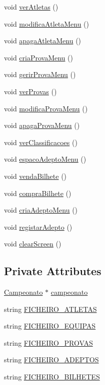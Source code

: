 \begin{DoxyCompactItemize}
void \hyperlink{class_menu_a10eed8f175ddff4a3f6b01010e7b462b}{ver\+Atletas} ()
\item 
void \hyperlink{class_menu_a1803b57b4861a1a9c512a15657eba2f2}{modifica\+Atleta\+Menu} ()
\item 
void \hyperlink{class_menu_a1297455c0dcde9efe57a977620a95091}{apaga\+Atleta\+Menu} ()
\item 
void \hyperlink{class_menu_a22f88ce6c2e5c2e99e3b5bb510f75725}{cria\+Prova\+Menu} ()
\item 
void \hyperlink{class_menu_ad27d59e38495e239dcad48d5bfba7aa5}{gerir\+Prova\+Menu} ()
\item 
void \hyperlink{class_menu_a8b215f578a6ec8be58b2d8cbe464dfcf}{ver\+Provas} ()
\item 
void \hyperlink{class_menu_a58d5cd0655078b665745f75af8bb43c4}{modifica\+Prova\+Menu} ()
\item 
void \hyperlink{class_menu_a4148128d956d192efbd3eb489ac170bb}{apaga\+Prova\+Menu} ()
\item 
void \hyperlink{class_menu_a6062588d8f20a4ab2304dc9c9fdaaa52}{ver\+Classificacoes} ()
\item 
void \hyperlink{class_menu_a98a46fa2c5c35c6875571bf2864b0e5e}{espaco\+Adepto\+Menu} ()
\item 
void \hyperlink{class_menu_a006d90f89c70667c1b78921d1699df87}{venda\+Bilhete} ()
\item 
void \hyperlink{class_menu_a1267ff1e1b75f1e1003522d1d99a8c7e}{compra\+Bilhete} ()
\item 
void \hyperlink{class_menu_a0bbe99d5051c3e1102d8e2521dacbc02}{cria\+Adepto\+Menu} ()
\item 
void \hyperlink{class_menu_a04fe7a1b1ef14f3629f0d837d1d7b287}{registar\+Adepto} ()
\item 
void \hyperlink{class_menu_ae3a5edcb580112ec449d12d9eb5a3e7c}{clear\+Screen} ()
\end{DoxyCompactItemize}
\subsection*{Private Attributes}
\begin{DoxyCompactItemize}
\item 
\hyperlink{class_campeonato}{Campeonato} $\ast$ \hyperlink{class_menu_a4e0fbefabd4ca8f21a2cd7fe46740166}{campeonato}
\item 
string \hyperlink{class_menu_a0ed6beccf2cea215fb8d7fbc6b8bfabd}{F\+I\+C\+H\+E\+I\+R\+O\+\_\+\+A\+T\+L\+E\+T\+A\+S}
\item 
string \hyperlink{class_menu_ae54280f85716f145088ac12362643990}{F\+I\+C\+H\+E\+I\+R\+O\+\_\+\+E\+Q\+U\+I\+P\+A\+S}
\item 
string \hyperlink{class_menu_a01ed844b35f6f85bd5e71457309cee88}{F\+I\+C\+H\+E\+I\+R\+O\+\_\+\+P\+R\+O\+V\+A\+S}
\item 
string \hyperlink{class_menu_a5d3e25021a6000471f857447f7ab96db}{F\+I\+C\+H\+E\+I\+R\+O\+\_\+\+A\+D\+E\+P\+T\+O\+S}
\item 
string \hyperlink{class_menu_aa976bc24d00fe46961f952d5f50018bb}{F\+I\+C\+H\+E\+I\+R\+O\+\_\+\+B\+I\+L\+H\+E\+T\+E\+S}
\end{DoxyCompactItemize}


